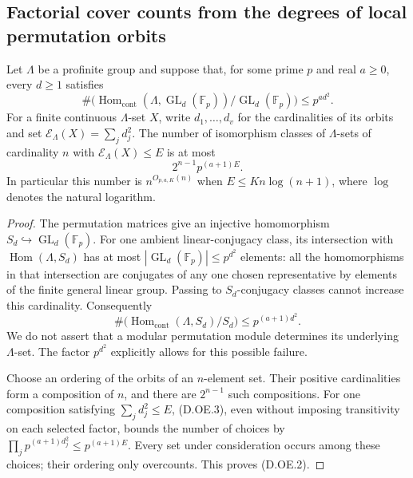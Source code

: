 \subsection{Factorial cover counts from the degrees of local permutation orbits}

\begin{lemma}
\label{D:local-permutation-orbit-energy}
Let $\Lambda$ be a profinite group and suppose that, for some prime $p$
and real $a\ge0$, every $d\ge1$ satisfies
\[
 \#\bigl(\operatorname{Hom}_{\mathrm{cont}}
       (\Lambda,\operatorname{GL}_d(\mathbb F_p))
           /\operatorname{GL}_d(\mathbb F_p)\bigr)
                       \le p^{a d^2}.                    \tag{D.OE.1}
\]
For a finite continuous $\Lambda$-set $X$, write $d_1,\ldots,d_v$
for the cardinalities of its orbits and set
$\mathcal E_\Lambda(X)=\sum_jd_j^2$.
The number of isomorphism classes of $\Lambda$-sets of cardinality $n$
with $\mathcal E_\Lambda(X)\le E$ is at most
\[
                         2^{n-1}p^{(a+1)E}.             \tag{D.OE.2}
\]
In particular this number is $n^{O_{p,a,K}(n)}$ when
$E\le K n\log(n+1)$, where $\log$ denotes the natural logarithm.
\end{lemma}
\begin{proof}
The permutation matrices give an injective homomorphism
$S_d\hookrightarrow\operatorname{GL}_d(\mathbb F_p)$.
For one ambient linear-conjugacy class, its intersection with
$\operatorname{Hom}(\Lambda,S_d)$ has at most
$|\operatorname{GL}_d(\mathbb F_p)|\le p^{d^2}$ elements:
all the homomorphisms in that intersection are conjugates of any
one chosen representative by elements of the finite general linear
group. Passing to $S_d$-conjugacy classes cannot increase this
cardinality. Consequently
\[
 \#\bigl(\operatorname{Hom}_{\mathrm{cont}}(\Lambda,S_d)/S_d\bigr)
                           \le p^{(a+1)d^2}.             \tag{D.OE.3}
\]
We do not assert that a modular permutation module determines its
underlying $\Lambda$-set. The factor $p^{d^2}$ explicitly allows
for this possible failure.

Choose an ordering of the orbits of an $n$-element set. Their positive
cardinalities form a composition of $n$, and there are $2^{n-1}$
such compositions. For one composition satisfying $\sum_jd_j^2\le E$,
(D.OE.3), even without imposing transitivity on each selected factor,
bounds the number of choices by
$\prod_j p^{(a+1)d_j^2}\le p^{(a+1)E}$.
Every set under consideration occurs among these choices; their
ordering only overcounts. This proves (D.OE.2).
\end{proof}

